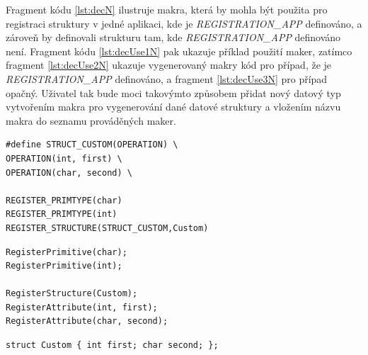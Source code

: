 \documentclass[11pt,twoside,a4paper]{book}
\begin{document}
Fragment kódu \ref{lst:decN} ilustruje makra, která by mohla být použita pro registraci struktury v jedné aplikaci, kde je \textit{REGISTRATION\_APP} definováno, a zároveň by definovali strukturu tam, kde \textit{REGISTRATION\_APP} definováno není. Fragment kódu \ref{lst:decUse1N} pak ukazuje příklad použití maker, zatímco fragment \ref{lst:decUse2N} ukazuje vygenerovaný makry kód pro případ, že je \textit{REGISTRATION\_APP} definováno, a fragment \ref{lst:decUse3N} pro případ opačný. Uživatel tak bude moci takovýmto způsobem přidat nový datový typ vytvořením makra pro vygenerování dané datové struktury a vložením názvu makra do seznamu prováděných maker.

\begin{lstlisting}[frame=single,caption=Ukázka makra\, které vytvoří/zaregistruje určitou strukturu. ,label=lst:decUse1N]
#define STRUCT_CUSTOM(OPERATION) \
OPERATION(int, first) \
OPERATION(char, second) \

REGISTER_PRIMTYPE(char)
REGISTER_PRIMTYPE(int)
REGISTER_STRUCTURE(STRUCT_CUSTOM,Custom)
\end{lstlisting}

\begin{lstlisting}[frame=single,caption=Kód vygenerovaný makrem\, který zaregistruje strukturu.,label=lst:decUse2N]
RegisterPrimitive(char);
RegisterPrimitive(int);

RegisterStructure(Custom);
RegisterAttribute(int, first);
RegisterAttribute(char, second);
\end{lstlisting}

\begin{lstlisting}[frame=single,caption=Deklarace struktury vygenerovaná pomocí makra.,label=lst:decUse3N]
struct Custom { int first; char second; };
\end{lstlisting}
 
\end{document}
